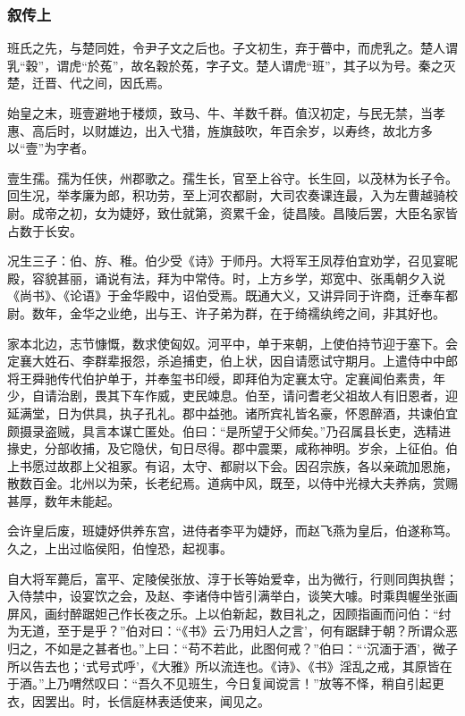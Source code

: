 \documentclass[]{article}
\begin{document}
\hypertarget{header-n6990}{%
\subsubsection{叙传上}\label{header-n6990}}

班氏之先，与楚同姓，令尹子文之后也。子文初生，弃于瞢中，而虎乳之。楚人谓乳``穀''，谓虎``於菟''，故名穀於菟，字子文。楚人谓虎``班''，其子以为号。秦之灭楚，迁晋、代之间，因氏焉。

始皇之末，班壹避地于楼烦，致马、牛、羊数千群。值汉初定，与民无禁，当孝惠、高后时，以财雄边，出入弋猎，旌旗鼓吹，年百余岁，以寿终，故北方多以``壹''为字者。

壹生孺。孺为任侠，州郡歌之。孺生长，官至上谷守。长生回，以茂林为长子令。回生况，举孝廉为郎，积功劳，至上河农都尉，大司农奏课连最，入为左曹越骑校尉。成帝之初，女为婕妤，致仕就第，资累千金，徒昌陵。昌陵后罢，大臣名家皆占数于长安。

况生三子：伯、斿、稚。伯少受《诗》于师丹。大将军王凤荐伯宜劝学，召见宴昵殿，容貌甚丽，诵说有法，拜为中常侍。时，上方乡学，郑宽中、张禹朝夕入说《尚书》、《论语》于金华殿中，诏伯受焉。既通大义，又讲异同于许商，迁奉车都尉。数年，金华之业绝，出与王、许子弟为群，在于绮襦纨绔之间，非其好也。

家本北边，志节慷慨，数求使匈奴。河平中，单于来朝，上使伯持节迎于塞下。会定襄大姓石、李群辈报怨，杀追捕吏，伯上状，因自请愿试守期月。上遣侍中中郎将王舜驰传代伯护单于，并奉玺书印绶，即拜伯为定襄太守。定襄闻伯素贵，年少，自请治剧，畏其下车作威，吏民竦息。伯至，请问耆老父祖故人有旧恩者，迎延满堂，日为供具，执子孔礼。郡中益弛。诸所宾礼皆名豪，怀恩醉酒，共谏伯宜颇摄录盗贼，具言本谋亡匿处。伯曰：``是所望于父师矣。''乃召属县长吏，选精进掾史，分部收捕，及它隐伏，旬日尽得。郡中震栗，咸称神明。岁余，上征伯。伯上书愿过故郡上父祖冢。有诏，太守、都尉以下会。因召宗族，各以亲疏加恩施，散数百金。北州以为荣，长老纪焉。道病中风，既至，以侍中光禄大夫养病，赏赐甚厚，数年未能起。

会许皇后废，班婕妤供养东宫，进侍者李平为婕妤，而赵飞燕为皇后，伯遂称笃。久之，上出过临侯阳，伯惶恐，起视事。

自大将军薨后，富平、定陵侯张放、淳于长等始爱幸，出为微行，行则同舆执辔；入侍禁中，设宴饮之会，及赵、李诸侍中皆引满举白，谈笑大噱。时乘舆幄坐张画屏风，画纣醉踞妲己作长夜之乐。上以伯新起，数目礼之，因顾指画而问伯：``纣为无道，至于是乎？''伯对曰：``《书》云`乃用妇人之言'，何有踞肆于朝？所谓众恶归之，不如是之甚者也。''上曰：``苟不若此，此图何戒？''伯曰：```沉湎于酒'，微子所以告去也；`式号式呼'，《大雅》所以流连也。《诗》、《书》淫乱之戒，其原皆在于酒。''上乃喟然叹曰：``吾久不见班生，今日复闻谠言！''放等不怿，稍自引起更衣，因罢出。时，长信庭林表适使来，闻见之。
\end{document}
